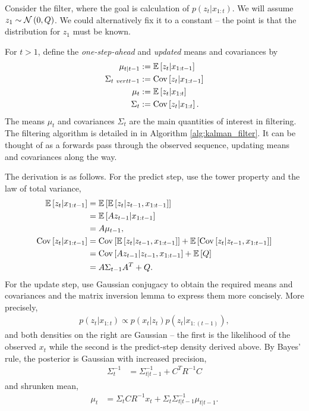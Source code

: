 \documentclass[14pt]{extarticle}
\begin{document}
Consider the filter, where the goal is calculation of $p\left(z_{t} \vert
x_{1:t}\right)$. We will assume $z_{1} \sim \mathcal{N}\left(0, Q\right)$. We
could alternatively fix it to a constant -- the point is that the distribution
for $z_{1}$ must be known.

For $t > 1$, define the \textit{one-step-ahead} and \textit{updated} means and
covariances by
\begin{align*}
  \mu_{t \vert t - 1} &:= \mathbb{E}\left[{z_{t} \vert x_{1:t - 1}}\right] \\
  \Sigma_{t \ vert t - 1} &:= \mathrm{Cov}\left[{z_{t} \vert x_{1:t - 1}}\right] \\
  \mu_{t} &:= \mathbb{E}\left[{z_{t} \vert x_{1:t}}\right] \\
  \Sigma_{t} &:= \mathrm{Cov}\left[{z_{t} \vert x_{1:t}}\right].
\end{align*}
The means $\mu_t$ and covariances $\Sigma_{t}$ are the main quantities of
interest in filtering. The filtering algorithm is detailed in in Algorithm
\ref{alg:kalman_filter}. It can be thought of as a forwards pass through the
observed sequence, updating means and covariances along the way.

The derivation is as follows. For the predict step, use the tower property and
the law of total variance,
\begin{align*}
  \mathbb{E}\left[{z_{t} \vert x_{1:t - 1}}\right] &= \mathbb{E}\left[{\mathbb{E}\left[{z_{t} \vert z_{t - 1}, x_{1:t - 1}}\right]}\right] \\
  & = \mathbb{E}\left[{Az_{t - 1}\vert x_{1:t - 1}}\right] \\
  &= A\mu_{t - 1}, \\
  \mathrm{Cov}\left[{z_{t} \vert x_{1:t - 1}}\right] &= \mathrm{Cov}\left[{\mathbb{E}\left[{z_{t} \vert z_{t - 1}, x_{1:t - 1}}\right]}\right] + \mathbb{E}\left[{\mathrm{Cov}\left[{z_{t} \vert z_{t - 1}, x_{1:t - 1}}\right]}\right] \\
  &= \mathrm{Cov}\left[{Az_{t - 1} \vert z_{t - 1}, x_{1:t - 1}}\right] + \mathbb{E}\left[{Q}\right] \\
  &= A\Sigma_{t - 1}A^{T} + Q.
\end{align*}
For the update step, use Gaussian conjugacy to obtain the required means and
covariances and the matrix inversion lemma to express them more concisely.
More precisely,
\begin{align*}
  p\left(z_{t} \vert x_{1:t}\right) \propto p\left(x_{t} \vert z_{t}\right)p\left(z_{t} \vert x_{1:\left(t - 1\right)}\right),
\end{align*}
and both densities on the right are Gaussian -- the first is the likelihood of
the observed $x_{t}$ while the second is the predict-step density derived above.
By Bayes' rule, the posterior is Gaussian with increased precision,
\begin{align}
  \label{eq:sigma_t_inv}
\Sigma_{t}^{-1} &= \Sigma_{t \vert t - 1}^{-1} + C^{T}R^{-1}C
\end{align}
and shrunken mean,
\begin{align}
  \label{eq:mu_t}
\mu_{t} &= \Sigma_{t}CR^{-1}x_{t} + \Sigma_{t}\Sigma_{t \vert t - 1}^{-1} \mu_{t \vert t - 1}.
\end{align}
\end{document}
